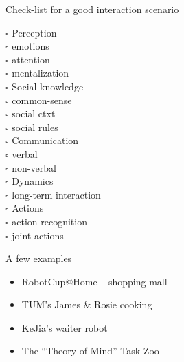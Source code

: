 \documentclass[compress]{beamer}
\begin{document}
\begin{frame}{Check-list for a good interaction scenario}
\begin{multicols}{2}
    \begin{multicols}{2}
    $\square$ Perception\\
    {\tiny
    \hspace*{0.4cm}$\square$ emotions\\
    \hspace*{0.4cm}$\square$ attention\\
    \hspace*{0.4cm}$\square$ mentalization\\
    }
    $\square$ Social knowledge\\
    {\tiny
    \hspace*{0.4cm}$\square$ common-sense\\
    \hspace*{0.4cm}$\square$ social ctxt\\
    \hspace*{0.4cm}$\square$ social rules\\
    }
    \vfill
    \columnbreak
    $\square$ Communication\\
    {\tiny
    \hspace*{0.4cm}$\square$ verbal\\
    \hspace*{0.4cm}$\square$ non-verbal\\
    }
    $\square$ Dynamics\\
    {\tiny
    \hspace*{0.2cm}$\square$ long-term interaction\\
    }
    $\square$ Actions\\
    {\tiny
    \hspace*{0.4cm}$\square$ action recognition\\
    \hspace*{0.4cm}$\square$ joint actions\\
    }
    \end{multicols}




    \end{multicols}

\end{frame}


\begin{frame}{A few examples}
    \begin{itemize}
        \item<1-> RobotCup@Home -- shopping mall
        \item<2-> TUM's James \& Rosie cooking
        \item<3-> KeJia's waiter robot
        \item<4-> The ``Theory of Mind'' Task Zoo
    \end{itemize}

    \centering
    \end{frame}
\end{document}
